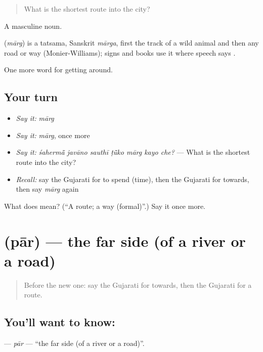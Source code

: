 \begin{quote}
What is the shortest route into the city?
\end{quote}

A masculine noun.

\begin{cousinweb}
\textbf{} (\emph{mārg}) is a tatsama, Sanskrit \emph{mārga}, first the track of a wild animal and then any road or way (Monier-Williams); signs and books use it where speech says .
\end{cousinweb}

\begin{grammarlens}[title={What you've built}]
One more word for getting around.
\end{grammarlens}

\subsection*{Your turn}
\begin{itemize}
\raggedright
  \item \emph{Say it:} \emph{mārg}
  \item \emph{Say it:} \emph{mārg}, once more
  \item \emph{Say it:} \emph{śahermā̃ javāno sauthī ṭū̃ko mārg kayo che?} — What is the shortest route into the city?
  \item \emph{Recall:} say the Gujarati for to spend (time), then the Gujarati for towards, then say \emph{mārg} again
\end{itemize}

\begin{tcolorbox}[breakable,colback=teal!4,colframe=teal!35!black,title={Before you move on}]
What does  mean? (\textquotedblleft{}A route; a way (formal)\textquotedblright{}.) Say it once more.
\end{tcolorbox}
\section[\texorpdfstring{\gu{પાર} (pār)}{પાર (pār)}]{ (pār) — the far side (of a river or a road)}

\label{lesson:GU-C413-par}



\begin{quote}
Before the new one: say the Gujarati for towards, then the Gujarati for a route.
\end{quote}

\subsection*{You'll want to know: }
\textbf{} — \emph{pār} — \textquotedblleft{}the far side (of a river or a road)\textquotedblright{}.

